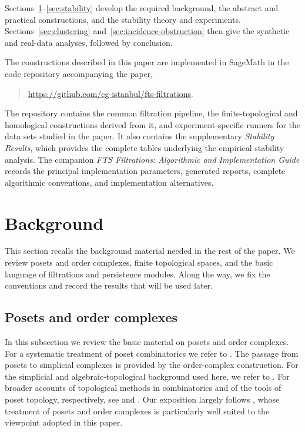 \documentclass[a4paper,11pt]{article}
\theoremstyle{definition}
\theoremstyle{remark}
\begin{document}
Sections~\ref{sec:background}--\ref{sec:stability} develop the required background, the abstract and practical constructions, and the stability theory and experiments. Sections~\ref{sec:clustering} and~\ref{sec:incidence-obstruction} then give the synthetic and real-data analyses, followed by conclusion.

The constructions described in this paper are implemented in SageMath in the code repository accompanying the paper,
\begin{quote}
\url{https://github.com/cg-istanbul/fts-filtrations}.
\end{quote}
The repository contains the common filtration pipeline, the finite-topological and homological constructions derived from it, and experiment-specific runners for the data sets studied in the paper. It also contains the supplementary \emph{Stability Results}, which provides the complete tables underlying the empirical stability analysis. The companion \emph{FTS Filtrations: Algorithmic and Implementation Guide} records the principal implementation parameters, generated reports, complete algorithmic conventions, and implementation alternatives.

\section{Background}\label{sec:background}

This section recalls the background material needed in the rest of the paper. We review posets and order complexes, finite topological spaces, and the basic language of filtrations and persistence modules. Along the way, we fix the conventions and record the results that will be used later.

\subsection{Posets and order complexes}\label{subsec:order-complexes-background}

In this subsection we review the basic material on posets and order complexes. For a systematic treatment of poset combinatorics we refer to \cite{Sta12}. The passage from posets to simplicial complexes is provided by the order-complex construction. For the simplicial and algebraic-topological background used here, we refer to \cite{MKP25}. For broader accounts of topological methods in combinatorics and of the tools of poset topology, respectively, see \cite{Bjo95} and \cite{Wac07}. Our exposition largely follows \cite{Smi11}, whose treatment of posets and order complexes is particularly well suited to the viewpoint adopted in this paper.
\end{document}
